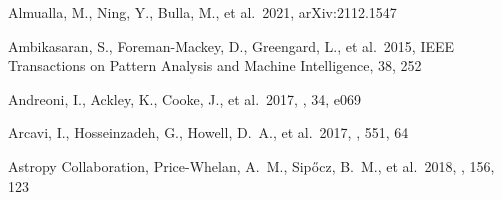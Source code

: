 \documentclass[twocolumn,twocolappendix]{aastex63}
\begin{document}
{\begin{thebibliography}{}







 Almualla, M., Ning, Y., Bulla, M., et al.\ 2021, arXiv:2112.1547



 Ambikasaran, S., Foreman-Mackey, D., Greengard, L., et al.\ 2015, IEEE Transactions on Pattern Analysis and Machine Intelligence, 38, 252




 Andreoni, I., Ackley, K., Cooke, J., et al.\ 2017, \pasa, 34, e069


 Arcavi, I., Hosseinzadeh, G., Howell, D.~A., et al.\ 2017, \nat, 551, 64




 Astropy Collaboration, Price-Whelan, A.~M., Sip{\H{o}}cz, B.~M., et al.\ 2018, \aj, 156, 123











\end{thebibliography}}
\end{document}
